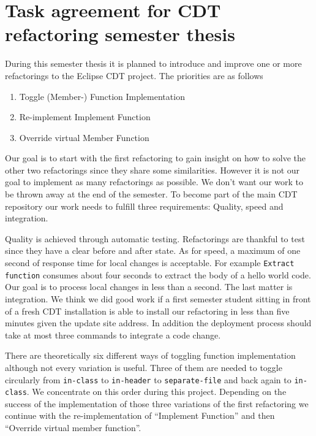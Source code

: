 \documentclass[a4paper,10pt]{scrreprt}
\begin{document}
\section*{Task agreement for CDT refactoring semester thesis}

During this semester thesis it is planned to introduce and improve one or more
refactorings to the Eclipse CDT project. The priorities are as follows

\begin{enumerate}
\item Toggle (Member-) Function Implementation
\item Re-implement Implement Function
\item Override virtual Member Function
\end{enumerate}

Our goal is to start with the first refactoring to gain insight on how to solve
the other two refactorings since they share some similarities. However it is not
our goal to implement as many refactorings as possible. We don't want our work
to be thrown away at the end of the semester. To become part of the main CDT
repository our work needs to fulfill three requirements: Quality, speed and
integration. 

Quality is achieved through automatic testing. Refactorings are thankful to test
since they have a clear before and after state. As for speed, a maximum of one
second of response time for local changes is
acceptable. For example \texttt{Extract function} consumes about four seconds to
extract the body of a hello world code. Our goal is to process local changes in
less than a second. The last matter is integration. We think we did good work if
a first semester student sitting in front of a fresh CDT installation is able to
install our refactoring in less than five minutes given the update site address.
In addition the deployment process should take at most three commands to
integrate a code change.\newline

There are theoretically six different ways of toggling function implementation
although not every variation is useful. Three of them are needed to toggle
circularly from \texttt{in-class} to \texttt{in-header} to
\texttt{separate-file}  and back again to \texttt{in-class}. We concentrate on
this order during this project.\newline
Depending on the success of the implementation of those three variations of the
first refactoring we continue with the re-implementation of  ``Implement
Function'' and then ``Override virtual member function''.
\end{document}
